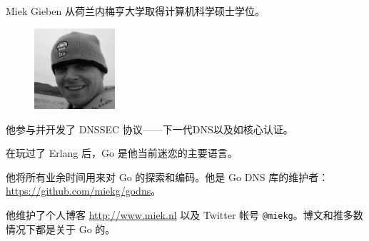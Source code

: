 Miek Gieben 从荷兰内梅亨大学取得计算机科学硕士学位。
\begin{figure}
  \begin{center}
  \includegraphics[width=3cm]{fig/avatar-miekg-300x300}
  \end{center}
\end{figure}

他参与并开发了 DNSSEC 协议——下一代DNS以及如核心认证\cite{RFC4641}。

在玩过了 Erlang 后，Go 是他当前迷恋的主要语言。

他将所有业余时间用来对 Go 的探索和编码。他是 Go DNS 库的维护者：\url{https://github.com/miekg/godns}。

他维护了个人博客 \url{http://www.miek.nl} 以及 Twitter 帐号 \texttt{@miekg}。博文和推多数情况下都是关于 Go 的。
